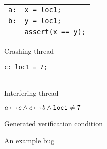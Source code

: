 \begin{figure}
  {\hfill}
  \begin{subfloat}
    \parbox{4cm}{
      \begin{tabular}{ll}
        {\tt a:} & {\tt x = loc1;}\\
        {\tt b:} & {\tt y = loc1;}\\
        & {\tt assert(x == y);}
      \end{tabular}
    }
    \caption{Crashing thread}
  \end{subfloat}
  {\hfill}
  \begin{subfloat}
    \parbox{3.2cm}{\tt c: loc1 = 7;}\\
    \caption{Interfering thread}
  \end{subfloat}
  {\hfill}
  \begin{subfloat}
    $a\,{\leftarrowtail}\,c \wedge c\,{\leftarrowtail}\,b \wedge \mathtt{loc1} \not= 7$
    \caption{Generated verification condition}
  \end{subfloat}
  {\hfill}
  \caption{An example bug}
  \label{fig:enforcement:example_bug}
\end{figure}

